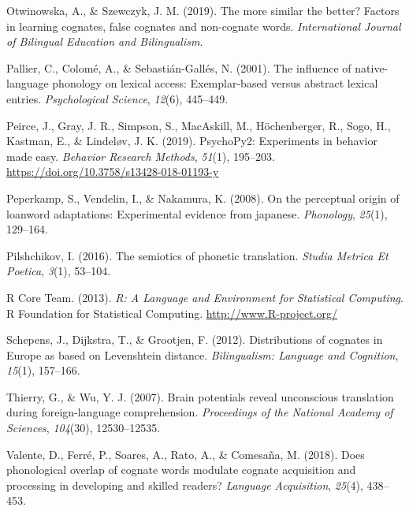 \documentclass[
]{article}
\newlength{\cslhangindent}
\newenvironment{CSLReferences}[2] %
 {\begin{list}{}{%
  \setlength{\itemindent}{0pt}
  \setlength{\leftmargin}{0pt}
  \setlength{\parsep}{0pt}
  \ifodd #1
   \setlength{\leftmargin}{\cslhangindent}
   \setlength{\itemindent}{-1\cslhangindent}
  \fi
  \setlength{\itemsep}{#2\baselineskip}}}
 {\end{list}}
\begin{document}
\begin{CSLReferences}{1}{0}
Otwinowska, A., \& Szewczyk, J. M. (2019). The more similar the better?
Factors in learning cognates, false cognates and non-cognate words.
\emph{International Journal of Bilingual Education and Bilingualism}.

Pallier, C., Colomé, A., \& Sebastián-Gallés, N. (2001). The influence
of native-language phonology on lexical access: Exemplar-based versus
abstract lexical entries. \emph{Psychological Science}, \emph{12}(6),
445--449.

Peirce, J., Gray, J. R., Simpson, S., MacAskill, M., Höchenberger, R.,
Sogo, H., Kastman, E., \& Lindeløv, J. K. (2019). {PsychoPy2}:
{Experiments} in behavior made easy. \emph{Behavior Research Methods},
\emph{51}(1), 195--203. \url{https://doi.org/10.3758/s13428-018-01193-y}

Peperkamp, S., Vendelin, I., \& Nakamura, K. (2008). On the perceptual
origin of loanword adaptations: Experimental evidence from japanese.
\emph{Phonology}, \emph{25}(1), 129--164.

Pilshchikov, I. (2016). The semiotics of phonetic translation.
\emph{Studia Metrica Et Poetica}, \emph{3}(1), 53--104.

R Core Team. (2013). \emph{R: {A Language} and {Environment} for
{Statistical Computing}}. R Foundation for Statistical Computing.
\url{http://www.R-project.org/}

Schepens, J., Dijkstra, T., \& Grootjen, F. (2012). Distributions of
cognates in {Europe} as based on {Levenshtein} distance.
\emph{Bilingualism: Language and Cognition}, \emph{15}(1), 157--166.

Thierry, G., \& Wu, Y. J. (2007). Brain potentials reveal unconscious
translation during foreign-language comprehension. \emph{Proceedings of
the National Academy of Sciences}, \emph{104}(30), 12530--12535.

Valente, D., Ferré, P., Soares, A., Rato, A., \& Comesaña, M. (2018).
Does phonological overlap of cognate words modulate cognate acquisition
and processing in developing and skilled readers? \emph{Language
Acquisition}, \emph{25}(4), 438--453.


\end{CSLReferences}
\end{document}

